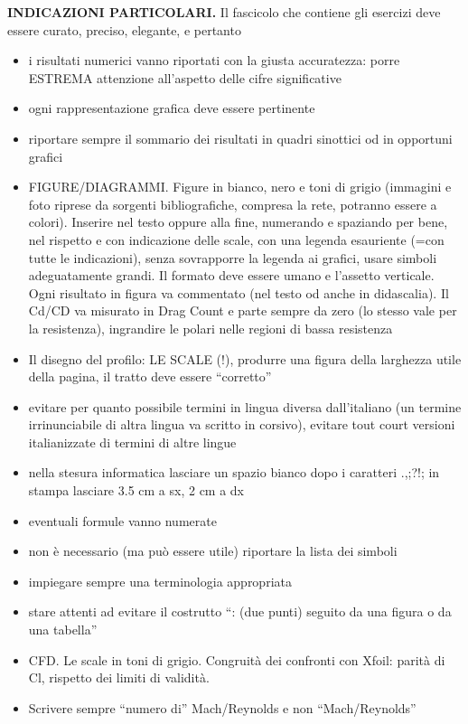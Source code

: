 \textbf{INDICAZIONI PARTICOLARI.} Il fascicolo che contiene gli esercizi deve essere curato, preciso, elegante, e pertanto \\[-1.6em]
\begin{itemize}
\setlength\itemsep{0em}
\item i risultati numerici vanno riportati con la giusta accuratezza: porre ESTREMA attenzione all'aspetto delle cifre significative
\item ogni rappresentazione grafica deve essere pertinente
\item riportare sempre il sommario dei risultati in quadri sinottici od in opportuni grafici
\item FIGURE/DIAGRAMMI. Figure in bianco, nero e toni di grigio (immagini e foto riprese da sorgenti bibliografiche, compresa la rete, potranno essere a colori). Inserire nel testo oppure alla fine, numerando e spaziando per bene, nel rispetto e con indicazione delle scale, con una legenda esauriente (=con tutte le indicazioni), senza sovrapporre la legenda ai grafici, usare simboli adeguatamente grandi. Il formato deve essere umano e l'assetto verticale. Ogni risultato in figura va commentato (nel testo od anche in didascalia). Il Cd/CD va misurato in Drag Count e parte sempre da zero (lo stesso vale per la resistenza), ingrandire le polari nelle regioni di bassa resistenza
\item Il disegno del profilo: LE SCALE (!), produrre una figura della larghezza utile della pagina, il tratto deve essere ``corretto''
\item evitare per quanto possibile termini in lingua diversa dall'italiano (un termine irrinunciabile di altra lingua va scritto in corsivo), evitare tout court versioni italianizzate di termini di altre lingue
\item nella stesura informatica lasciare un spazio bianco dopo i caratteri .,;?!; in stampa lasciare 3.5 cm a sx, 2 cm a dx
\item eventuali formule vanno numerate
\item non è necessario (ma può essere utile) riportare la lista dei simboli
\item impiegare sempre una terminologia appropriata
\item stare attenti ad evitare il costrutto “: (due punti) seguito da una figura o da una tabella”
\item CFD. Le scale in toni di grigio. Congruità dei confronti con Xfoil: parità di Cl, rispetto dei limiti di validità.
\item Scrivere sempre “numero di” Mach/Reynolds e non “Mach/Reynolds”
\end{itemize}

